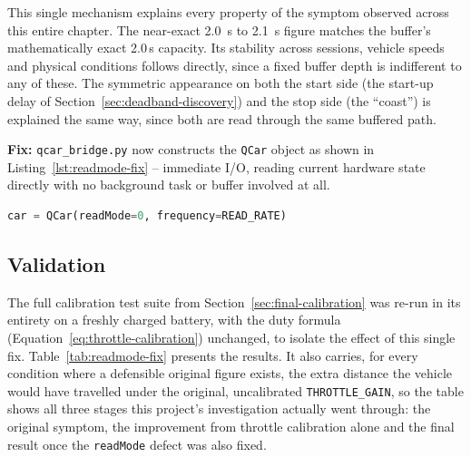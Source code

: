 This single mechanism explains every property of the symptom
observed across this entire chapter. The near-exact
\SI{2.0}{\second} to \SI{2.1}{\second} figure matches the buffer's
mathematically exact 2.0\,s capacity. Its stability across sessions,
vehicle speeds and physical conditions follows directly, since a
fixed buffer depth is indifferent to any of these. The symmetric
appearance on both the start side (the start-up delay of
Section~\ref{sec:deadband-discovery}) and the stop side (the
``coast'') is explained the same way, since both are read through
the same buffered path.

\textbf{Fix:} \texttt{qcar\_bridge.py} now constructs the \texttt{QCar}
object as shown in Listing~\ref{lst:readmode-fix} -- immediate I/O,
reading current hardware state directly with no background task or
buffer involved at all.

\begin{lstlisting}[language=Python,caption={The one-line HAL construction change that fixed the buffering defect (\texttt{qcar\_bridge.py}).},label={lst:readmode-fix}]
car = QCar(readMode=0, frequency=READ_RATE)
\end{lstlisting}

\subsection{Validation}
\label{sec:readmode-validation}

The full calibration test suite from Section~\ref{sec:final-calibration}
was re-run in its entirety on a freshly charged battery, with the
duty formula (Equation~\ref{eq:throttle-calibration}) unchanged, to
isolate the effect of this single fix. Table~\ref{tab:readmode-fix}
presents the results. It also carries, for every condition where a
defensible original figure exists, the extra distance the vehicle
would have travelled under the original, uncalibrated
\texttt{THROTTLE\_GAIN}, so the table shows all three stages this
project's investigation actually went through: the original symptom,
the improvement from throttle calibration alone and the final result
once the \texttt{readMode} defect was also fixed.

